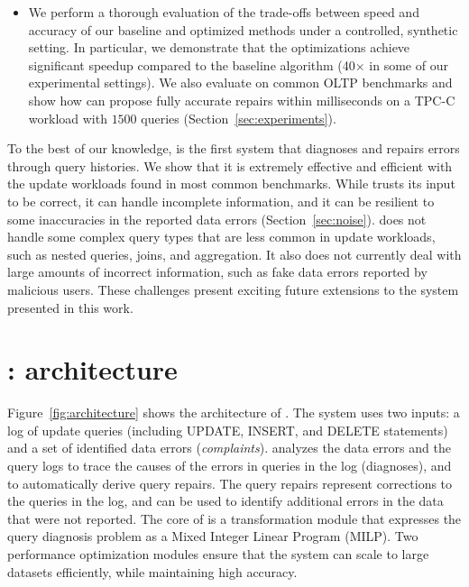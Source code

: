 \begin{itemize}[leftmargin=*, topsep=0mm, itemsep=0mm]
    \item We perform a thorough evaluation of the trade-offs between speed and accuracy of our baseline and optimized methods under a controlled, synthetic setting. In particular, we demonstrate that the  \sys optimizations achieve significant speedup compared to the baseline algorithm (40$\times$ in some of our experimental settings).
    We also evaluate \sys on common OLTP benchmarks and show how \sys can propose fully accurate repairs within milliseconds on a TPC-C workload with $1500$ queries (Section~\ref{sec:experiments}).
\end{itemize}

To the best of our knowledge, \sys is the first system that diagnoses
and repairs errors through query histories. We show that it is
extremely effective and efficient with the update workloads found in
most common benchmarks. 
While \sys trusts its input to be correct, it
can handle incomplete information, and it can be resilient to some
inaccuracies in the reported data errors (Section~\ref{sec:noise}).
\sys does not handle some complex query types
that are less common in update workloads, such as nested queries,
joins, and aggregation. 
It also does not currently deal with large amounts of incorrect
information, such as fake data errors reported by malicious users.
These challenges present exciting future extensions to the system presented in this work.






\section{{\large\textbf{\sys}}: architecture}




Figure~\ref{fig:architecture} shows the architecture of \sys. The system uses
two inputs: a log of update queries (including UPDATE, INSERT, and DELETE
statements) and a set of identified data errors (\emph{complaints}). \sys
analyzes the data errors and the query logs to trace the causes of the errors
in queries in the log (diagnoses), and to automatically derive query repairs.
The query repairs represent corrections to the queries in the log, and can be
used to identify additional errors in the data that were not reported.
% 
The core of \sys is a transformation module that expresses the query diagnosis
problem as a Mixed Integer Linear Program (MILP). Two performance optimization modules
ensure that the system can scale to large datasets efficiently, while
maintaining high accuracy. 

